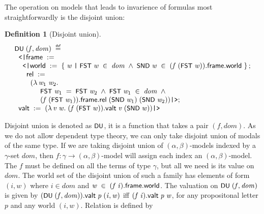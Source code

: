 \documentclass[letterpaper]{article}
\newtheorem{defn}{Definition}
\renewcommand{\HOLConst}[1]{{\textsf{\upshape\small #1}}}
\renewcommand{\HOLinline}[1]{\ensuremath{#1}}
\newenvironment{holmath}{\begin{displaymath}\begin{array}{l}}{\end{array}\end{displaymath}\ignorespacesafterend}
\begin{document}
The operation on models that leads to invarience of formulas most straightforwardly is the disjoint union:
\begin{defn}[Disjoint union]
\begin{holmath}
   \HOLConst{DU}\;(\HOLFreeVar{f}\HOLSymConst{,}\HOLFreeVar{dom})\;\HOLSymConst{\HOLTokenDefEquality{}}\\
\;\;\HOLTokenLeftrec{}\HOLFieldName{frame}\;:=\\
\;\;\;\;\HOLTokenLeftrec{}\HOLFieldName{world}\;:=\;\HOLTokenLeftbrace{}\HOLBoundVar{w}\;\HOLTokenBar{}\;\HOLConst{FST}\;\HOLBoundVar{w}\;\HOLSymConst{\HOLTokenIn{}}\;\HOLFreeVar{dom}\;\HOLSymConst{\HOLTokenConj{}}\;\HOLConst{SND}\;\HOLBoundVar{w}\;\HOLSymConst{\HOLTokenIn{}}\;(\HOLFreeVar{f}\;(\HOLConst{FST}\;\HOLBoundVar{w})).\HOLFieldName{frame}.\HOLFieldName{world}\HOLTokenRightbrace{};\\
\;\;\;\;\;\;\HOLFieldName{rel}\;:=\\
\;\;\;\;\;\;\;\;(\HOLTokenLambda{}\HOLBoundVar{w\sb{\mathrm{1}}}\;\HOLBoundVar{w\sb{\mathrm{2}}}.\\
\;\;\;\;\;\;\;\;\;\;\;\;\;\HOLConst{FST}\;\HOLBoundVar{w\sb{\mathrm{1}}}\;\HOLSymConst{=}\;\HOLConst{FST}\;\HOLBoundVar{w\sb{\mathrm{2}}}\;\HOLSymConst{\HOLTokenConj{}}\;\HOLConst{FST}\;\HOLBoundVar{w\sb{\mathrm{1}}}\;\HOLSymConst{\HOLTokenIn{}}\;\HOLFreeVar{dom}\;\HOLSymConst{\HOLTokenConj{}}\\
\;\;\;\;\;\;\;\;\;\;\;\;\;(\HOLFreeVar{f}\;(\HOLConst{FST}\;\HOLBoundVar{w\sb{\mathrm{1}}})).\HOLFieldName{frame}.\HOLFieldName{rel}\;(\HOLConst{SND}\;\HOLBoundVar{w\sb{\mathrm{1}}})\;(\HOLConst{SND}\;\HOLBoundVar{w\sb{\mathrm{2}}}))\HOLTokenRightrec{};\\
\;\;\HOLFieldName{valt}\;:=\;(\HOLTokenLambda{}\HOLBoundVar{v}\;\HOLBoundVar{w}.\;(\HOLFreeVar{f}\;(\HOLConst{FST}\;\HOLBoundVar{w})).\HOLFieldName{valt}\;\HOLBoundVar{v}\;(\HOLConst{SND}\;\HOLBoundVar{w}))\HOLTokenRightrec{}
\end{holmath} 
\end{defn}
Disjoint union is denoted as \HOLinline{\HOLConst{DU}}, it is a function that takes a pair $(f,dom)$. As we do not allow dependent type theory, we can only take disjoint union of modals of the same type. If we are taking disjoint union of $(\alpha,\beta)$-models indexed by a $\gamma$-set $dom$, then $f:\gamma\to (\alpha,\beta)$-model will assign each index an $(\alpha,\beta)$-model. The $f$ must be defined on all the terms of type $\gamma$, but all we need is its value on $dom$. The world set of the disjoint union of such a family has elements of form $(i,w)$ where $i\in dom$ and \HOLinline{\HOLFreeVar{w}\;\HOLSymConst{\HOLTokenIn{}}\;(\HOLFreeVar{f}\;\HOLFreeVar{i}).\HOLFieldName{frame}.\HOLFieldName{world}}. The valuation on \HOLinline{\HOLConst{DU}\;(\HOLFreeVar{f}\HOLSymConst{,}\HOLFreeVar{dom})} is given by \HOLinline{(\HOLConst{DU}\;(\HOLFreeVar{f}\HOLSymConst{,}\HOLFreeVar{dom})).\HOLFieldName{valt}\;\HOLFreeVar{p}\;(\HOLFreeVar{i}\HOLSymConst{,}\HOLFreeVar{w})} iff \HOLinline{(\HOLFreeVar{f}\;\HOLFreeVar{i}).\HOLFieldName{valt}\;\HOLFreeVar{p}\;\HOLFreeVar{w}}, for any propositonal letter $p$ and any world $(i,w)$. Relation is defined by
\end{document}
